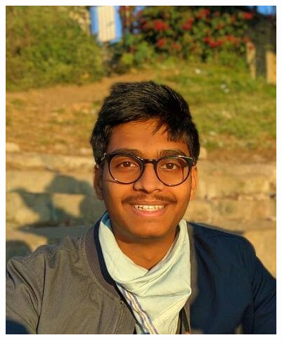 \documentclass[margin,line]{res}
\begin{document}
	 \hfill \includegraphics[scale=0.35]{photo.jpg}
	\vspace{-.25in}
\end{document}
